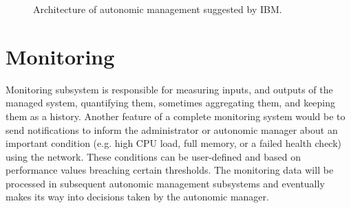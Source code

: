 \begin{figure}
	\centering		
	\caption{Architecture of autonomic management suggested by IBM.} 
	\label{fig:mapeloop}
\end{figure}

% 
% 

\section{Monitoring}
Monitoring subsystem is responsible for measuring inputs, and outputs of the managed system, quantifying them, sometimes aggregating them, and keeping them as a history. 
Another feature of a complete monitoring system would be to send notifications to inform the administrator or autonomic manager about an important condition (e.g. high CPU load, full memory, or a failed health check) using the network. These conditions can be user-defined and based on performance values breaching certain thresholds. 
The monitoring data will be processed in subsequent autonomic management subsystems and eventually makes its way into decisions taken by the autonomic manager. 

